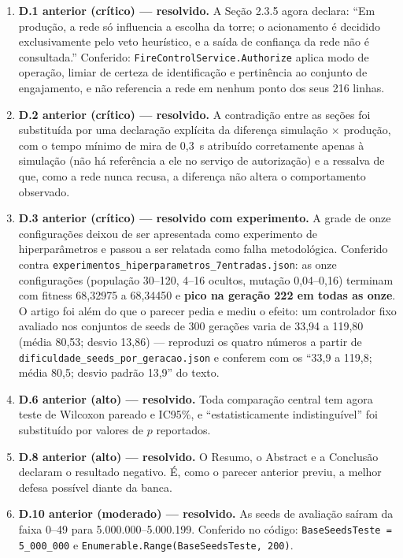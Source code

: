 \documentclass[11pt,a4paper]{article}
\begin{document}
\begin{enumerate}
  \item \textbf{D.1 anterior (crítico) --- resolvido.} A Seção 2.3.5 agora declara: ``Em produção, a
  rede só influencia a escolha da torre; o acionamento é decidido exclusivamente pelo veto
  heurístico, e a saída de confiança da rede não é consultada.'' Conferido:
  \texttt{FireControlService.Authorize} aplica modo de operação, limiar de certeza de identificação e
  pertinência ao conjunto de engajamento, e não referencia a rede em nenhum ponto dos seus 216
  linhas.

  \item \textbf{D.2 anterior (crítico) --- resolvido.} A contradição entre as seções foi substituída
  por uma declaração explícita da diferença simulação $\times$ produção, com o tempo mínimo de mira
  de 0,3~s atribuído corretamente apenas à simulação (não há referência a ele no serviço de
  autorização) e a ressalva de que, como a rede nunca recusa, a diferença não altera o comportamento
  observado.

  \item \textbf{D.3 anterior (crítico) --- resolvido com experimento.} A grade de onze configurações
  deixou de ser apresentada como experimento de hiperparâmetros e passou a ser relatada como falha
  metodológica. Conferido contra \texttt{experimentos\_hiperparametros\_7entradas.json}: as onze
  configurações (população 30--120, 4--16 ocultos, mutação 0,04--0,16) terminam com fitness 68,32975
  a 68,34450 e \textbf{pico na geração 222 em todas as onze}. O artigo foi além do que o parecer
  pedia e mediu o efeito: um controlador fixo avaliado nos conjuntos de seeds de 300 gerações varia
  de 33,94 a 119,80 (média 80,53; desvio 13,86) --- reproduzi os quatro números a partir de
  \texttt{dificuldade\_seeds\_por\_geracao.json} e conferem com os ``33,9 a 119,8; média 80,5; desvio
  padrão 13,9'' do texto.

  \item \textbf{D.6 anterior (alto) --- resolvido.} Toda comparação central tem agora teste de
  Wilcoxon pareado e IC95\%, e ``estatisticamente indistinguível'' foi substituído por valores de $p$
  reportados.

  \item \textbf{D.8 anterior (alto) --- resolvido.} O Resumo, o Abstract e a Conclusão declaram o
  resultado negativo. É, como o parecer anterior previu, a melhor defesa possível diante da banca.

  \item \textbf{D.10 anterior (moderado) --- resolvido.} As seeds de avaliação saíram da faixa 0--49
  para 5.000.000--5.000.199. Conferido no código: \texttt{BaseSeedsTeste = 5\_000\_000} e
  \texttt{Enumerable.Range(BaseSeedsTeste, 200)}.


\end{enumerate}
\end{document}

